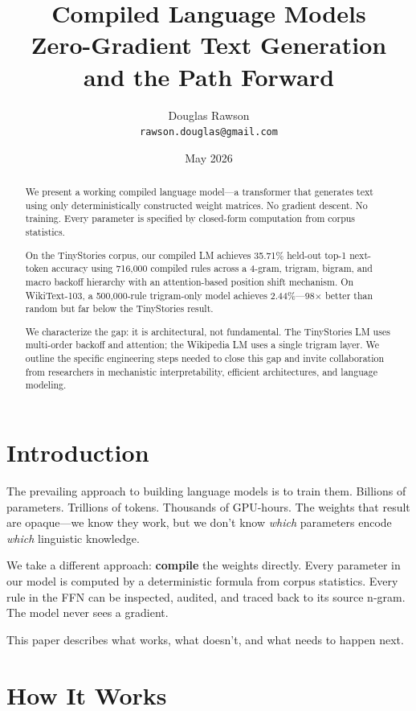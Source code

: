 \documentclass[11pt,a4paper]{article}
\title{\textbf{Compiled Language Models}\\[4pt]
       \large Zero-Gradient Text Generation and the Path Forward}
\author{Douglas Rawson\\ \texttt{rawson.douglas@gmail.com}}
\date{May 2026}
\begin{document}
\maketitle

\begin{abstract}
We present a working compiled language model---a transformer that generates text using only
deterministically constructed weight matrices. No gradient descent. No training. Every parameter
is specified by closed-form computation from corpus statistics.

On the TinyStories corpus, our compiled LM achieves 35.71\% held-out top-1 next-token accuracy
using 716,000 compiled rules across a 4-gram, trigram, bigram, and macro backoff hierarchy with
an attention-based position shift mechanism. On WikiText-103, a 500,000-rule trigram-only model
achieves 2.44\%---98$\times$ better than random but far below the TinyStories result.

We characterize the gap: it is architectural, not fundamental. The TinyStories LM uses
multi-order backoff and attention; the Wikipedia LM uses a single trigram layer. We outline the
specific engineering steps needed to close this gap and invite collaboration from researchers
in mechanistic interpretability, efficient architectures, and language modeling.
\end{abstract}

\section{Introduction}

The prevailing approach to building language models is to train them. Billions of parameters.
Trillions of tokens. Thousands of GPU-hours. The weights that result are opaque---we know they
work, but we don't know \emph{which} parameters encode \emph{which} linguistic knowledge.

We take a different approach: \textbf{compile} the weights directly. Every parameter in our model
is computed by a deterministic formula from corpus statistics. Every rule in the FFN can be
inspected, audited, and traced back to its source n-gram. The model never sees a gradient.

This paper describes what works, what doesn't, and what needs to happen next.

\section{How It Works}
\end{document}
